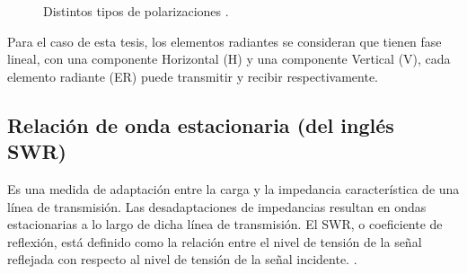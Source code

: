 \begin{figure}[H]
	\centering
	\caption{Distintos tipos de polarizaciones \cite{Hecht2002}.}
	\label{fig:hvPolarizations}
\end{figure}

Para el caso de esta tesis, los elementos radiantes se consideran que tienen fase lineal, con una componente Horizontal (H) y una
componente Vertical (V), cada elemento radiante (ER) puede transmitir y recibir respectivamente.


\subsection{Relación de onda estacionaria (del inglés SWR)}

Es una medida de adaptación entre la carga y la impedancia característica de una línea de transmisión. Las desadaptaciones de
impedancias resultan en ondas estacionarias a lo largo de dicha línea de transmisión. El SWR, o coeficiente de reflexión, está
definido como la relación entre el nivel de tensión de la señal reflejada con respecto al nivel de tensión de la señal incidente.
\cite{AgilentTechnologies2012}.

